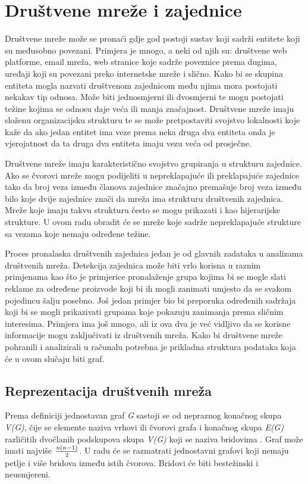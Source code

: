 \chapter{Društvene mreže i zajednice}

Društvene mreže može se pronaći gdje god postoji sustav koji sadrži entitete koji su međusobno povezani. Primjera je mnogo, a neki od njih su: društvene web platforme, email mreža, web stranice koje sadrže poveznice prema dugima, uređaji koji su povezani preko internetske mreže i slično. 
Kako bi se skupina entiteta mogla nazvati društvenom zajednicom među njima mora postojati nekakav tip odnosa. Može biti jednosmjerni ili dvosmjerni te mogu postojati težine kojima se odnosu daje veća ili manja značajnost. Društvene mreže imaju složenu organizacijsku strukturu te se može pretpostaviti svojstvo lokalnosti koje kaže da ako jedan entitet ima veze prema neka druga dva entiteta onda je vjerojatnost da ta druga dva entiteta imaju vezu veća od prosječne. 

Društvene mreže imaju karakteristično svojstvo grupiranja u strukturu zajednice. Ako se čvorovi mreže mogu podijeliti u nepreklapajuće ili preklapajuće zajednice tako da broj veza između članova zajednice značajno premašuje broj veza između bilo koje dvije zajednice znači da mreža ima strukturu društvenih zajednica. Mreže koje imaju takvu strukturu često se mogu prikazati i kao hijerarijske strukture. U ovom radu obradit će se mreže koje sadrže nepreklapajuće strukture sa vezama koje nemaju određene težine.

Proces pronalaska društvenih zajednica jedan je od glavnih zadataka u analizama društvenih mreža. Detekcija zajednica može biti vrlo korisna u raznim primjenama kao što je primjerice pronalaženje grupa kojima bi se mogle slati reklame za određene proizvode koji bi ih mogli zanimati umjesto da se svakom pojedincu šalju posebno. Još jedan primjer bio bi preporuka određenih sadržaja koji bi se mogli prikazivati grupama koje pokazuju zanimanja prema sličnim interesima. Primjera ima još mnogo, ali iz ova dva je već vidljivo da se korisne informacije mogu zaključivati iz društvenih mreža. Kako bi društvene mreže pohranili i analizirali u računalu potrebna je prikladna struktura podataka koja će u ovom slučaju biti graf.

\section{Reprezentacija društvenih mreža}
Prema definiciji jednostavan graf \textit{G} sastoji se od nepraznog konačnog skupa \textit{V(G)}, čije se elemente naziva vrhovi ili čvorovi grafa i konačnog skupa \textit{E(G)} različitih dvočlanih podskupova skupa \textit{V(G)} koji se naziva bridovima \cite{nakic_pavcevic_2019}. Graf može imati najviše $ {n(n-1) \over 2} $. U radu će se razmatrati jednostavni grafovi koji nemaju petlje i više bridova između istih čvorova. Bridovi će biti bestežinski i neusmjereni. 

